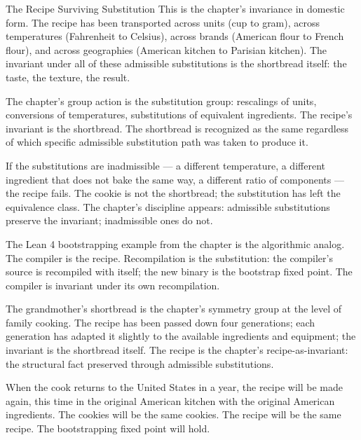 \begin{coda}{The Recipe Surviving Substitution}
This is the chapter's invariance in domestic form. The recipe has
been transported across units (cup to gram), across temperatures
(Fahrenheit to Celsius), across brands (American flour to French
flour), and across geographies (American kitchen to Parisian
kitchen). The invariant under all of these admissible
substitutions is the shortbread itself: the taste, the texture,
the result.

The chapter's group action is the substitution group: rescalings
of units, conversions of temperatures, substitutions of equivalent
ingredients. The recipe's invariant is the shortbread. The
shortbread is recognized as the same regardless of which specific
admissible substitution path was taken to produce it.

If the substitutions are inadmissible --- a different temperature,
a different ingredient that does not bake the same way, a
different ratio of components --- the recipe fails. The cookie is
not the shortbread; the substitution has left the equivalence
class. The chapter's discipline appears: admissible substitutions
preserve the invariant; inadmissible ones do not.

The Lean 4 bootstrapping example from the chapter is the
algorithmic analog. The compiler is the recipe. Recompilation
is the substitution: the compiler's source is recompiled with
itself; the new binary is the bootstrap fixed point. The
compiler is invariant under its own recompilation.

The grandmother's shortbread is the chapter's symmetry group at
the level of family cooking. The recipe has been passed down four
generations; each generation has adapted it slightly to the
available ingredients and equipment; the invariant is the
shortbread itself. The recipe is the chapter's recipe-as-invariant:
the structural fact preserved through admissible substitutions.

When the cook returns to the United States in a year, the recipe
will be made again, this time in the original American kitchen
with the original American ingredients. The cookies will be the
same cookies. The recipe will be the same recipe. The
bootstrapping fixed point will hold.

\end{coda}
